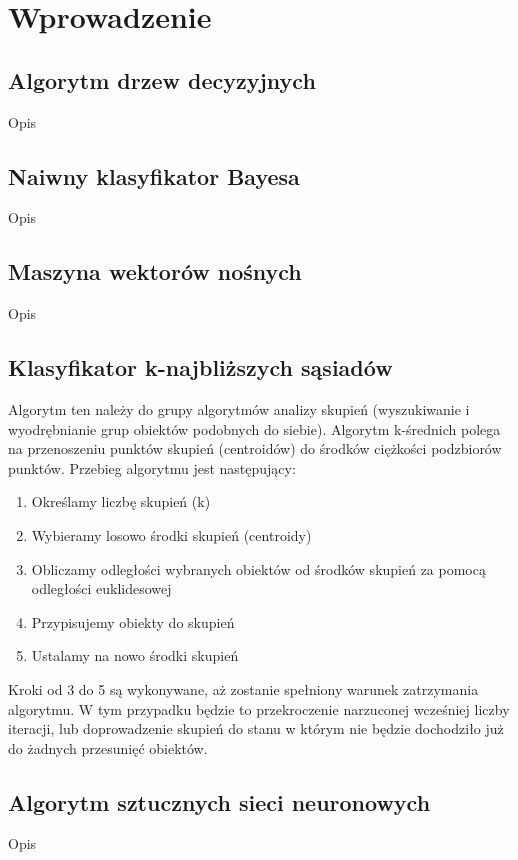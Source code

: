 \documentclass[a4paper,11pt]{article}
\begin{document}
\section{Wprowadzenie}
\subsection{Algorytm drzew decyzyjnych}
Opis

\subsection{Naiwny klasyfikator Bayesa}
Opis

\subsection{Maszyna wektorów nośnych}
Opis

\subsection{Klasyfikator k-najbliższych sąsiadów}
Algorytm ten należy do grupy algorytmów analizy skupień (wyszukiwanie i wyodrębnianie grup obiektów podobnych do siebie). Algorytm k-średnich polega na przenoszeniu punktów skupień (centroidów) do środków ciężkości podzbiorów punktów. Przebieg algorytmu jest następujący:
\begin{enumerate}
    \item{Określamy liczbę skupień (k)}
    \item{Wybieramy losowo środki skupień (centroidy)}
    \item{Obliczamy odległości wybranych obiektów od środków skupień za pomocą odległości euklidesowej}
    \item{Przypisujemy obiekty do skupień}
    \item{Ustalamy na nowo środki skupień}
\end{enumerate}
Kroki od 3 do 5 są wykonywane, aż zostanie spełniony warunek zatrzymania algorytmu. W tym przypadku będzie to przekroczenie narzuconej wcześniej liczby iteracji, lub doprowadzenie skupień do stanu w którym nie będzie dochodziło już do żadnych przesunięć obiektów.

\subsection{Algorytm sztucznych sieci neuronowych}
Opis
\end{document}
